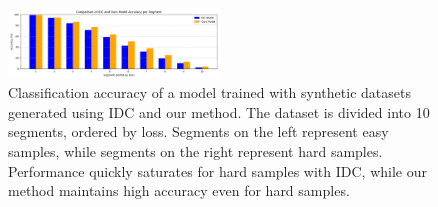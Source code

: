 \documentclass{article}
\theoremstyle{plain}
\theoremstyle{definition}
\theoremstyle{remark}
\begin{document}
\begin{figure}[t]
    \centering
    \includegraphics[width=0.5\textwidth]{./images/loss.png}
    \caption{Classification accuracy of a model trained with synthetic datasets generated using IDC and our method.
    The dataset is divided into 10 segments, ordered by loss. Segments on the left represent easy samples,
    while segments on the right represent hard samples. Performance quickly saturates
    for hard samples with IDC, while our method maintains high accuracy even for hard samples.}
    \label{fig:loss}
\end{figure}
\end{document}
